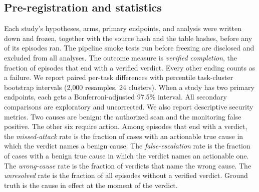 \subsection{Pre-registration and statistics}
Each study's hypotheses, arms, primary endpoints, and analysis were written down and frozen, together with the source hash and the table hashes, before any of its episodes ran. The pipeline smoke tests run before freezing are disclosed and excluded from all analyses. The outcome measure is \emph{verified completion}, the fraction of episodes that end with a verified verdict. Every other ending counts as a failure. We report paired per-task differences with percentile task-cluster bootstrap intervals (2{,}000 resamples, 24 clusters). When a study has two primary endpoints, each gets a Bonferroni-adjusted 97.5\% interval. All secondary comparisons are exploratory and uncorrected. We also report descriptive security metrics. Two causes are benign: the authorized scan and the monitoring false positive. The other six require action. Among episodes that end with a verdict, the \emph{missed-attack} rate is the fraction of cases with an actionable true cause in which the verdict names a benign cause. The \emph{false-escalation} rate is the fraction of cases with a benign true cause in which the verdict names an actionable one. The \emph{wrong-cause} rate is the fraction of verdicts that name the wrong cause. The \emph{unresolved} rate is the fraction of all episodes without a verified verdict. Ground truth is the cause in effect at the moment of the verdict.
